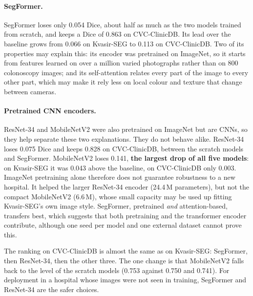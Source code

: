 \paragraph{SegFormer.} SegFormer loses only 0.054 Dice, about half as much as the two models trained from scratch, and
keeps a Dice of 0.863 on CVC-ClinicDB. Its lead over the baseline grows from 0.066 on Kvasir-SEG to 0.113 on
CVC-ClinicDB. Two of its properties may explain this: its encoder was pretrained on ImageNet, so it starts from
features learned on over a million varied photographs rather than on 800 colonoscopy images; and its
self-attention relates every part of the image to every other part, which may make it rely less on local colour
and texture that change between cameras.

\paragraph{Pretrained CNN encoders.} ResNet-34 and MobileNetV2 were also pretrained on ImageNet but are CNNs, so they help
separate these two explanations. They do not behave alike. ResNet-34 loses 0.075 Dice and keeps 0.828 on
CVC-ClinicDB, between the scratch models and SegFormer. MobileNetV2 loses 0.141, \textbf{the largest drop of all five
models}: on Kvasir-SEG it was 0.043 above the baseline, on CVC-ClinicDB only 0.003. ImageNet pretraining alone
therefore does not guarantee robustness to a new hospital. It helped the larger ResNet-34 encoder (24.4\,M
parameters), but not the compact MobileNetV2 (6.6\,M), whose small capacity may be used up fitting Kvasir-SEG's
own image style. SegFormer, pretrained \emph{and} attention-based, transfers best, which suggests that both pretraining
and the transformer encoder contribute, although one seed per model and one external dataset cannot prove this.

The ranking on CVC-ClinicDB is almost the same as on Kvasir-SEG: SegFormer, then ResNet-34, then the other three.
The one change is that MobileNetV2 falls back to the level of the scratch models (0.753 against 0.750 and 0.741).
For deployment in a hospital whose images were not seen in training, SegFormer and ResNet-34 are the safer
choices.

